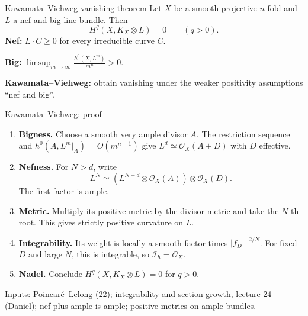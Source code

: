 \documentclass[aspectratio=169,11pt]{beamer}
\newcommand{\cI}{\mathcal I}
\newcommand{\cO}{\mathcal O}
\begin{document}
\begin{frame}{Kawamata--Viehweg vanishing theorem}
Let \(X\) be a smooth projective \(n\)-fold and \(L\) a nef and big
line bundle. Then
\[
\boxed{H^q(X,K_X\otimes L)=0\qquad(q>0).}
\]
\textbf{Nef:} \(L\cdot C\ge0\) for every irreducible curve \(C\).
\medskip

\textbf{Big:} \(\displaystyle\limsup_{m\to\infty}
\frac{h^0(X,L^m)}{m^n}>0\).
\medskip

\textbf{Kawamata--Viehweg:} obtain vanishing under the weaker
positivity assumptions \textquotedblleft nef and big\textquotedblright.
\end{frame}

\begin{frame}{Kawamata--Viehweg: proof}
\small
\begin{enumerate}
\setlength{\itemsep}{7pt}
\item \textbf{Bigness.} Choose a smooth very ample divisor \(A\).
The restriction sequence and
\(h^0(A,L^m|_A)=O(m^{n-1})\) give
\(L^d\simeq\cO_X(A+D)\) with \(D\) effective.
\item \textbf{Nefness.} For \(N>d\), write
\[
L^N\simeq(L^{N-d}\otimes\cO_X(A))\otimes\cO_X(D).
\]
The first factor is ample.
\item \textbf{Metric.} Multiply its positive metric by the divisor
metric and take the \(N\)-th root. This gives strictly positive curvature on \(L\).
\item \textbf{Integrability.} Its weight is locally a smooth factor
times \(|f_D|^{-2/N}\). For fixed \(D\) and large \(N\), this is
integrable, so \(\cI_h=\cO_X\).
\item \textbf{Nadel.} Conclude \(H^q(X,K_X\otimes L)=0\) for \(q>0\).
\end{enumerate}
\medskip
\footnotesize
Inputs: Poincaré--Lelong (22); integrability and section growth, lecture 24 (Daniel);
nef plus ample is ample; positive metrics on ample bundles.
\end{frame}
\end{document}
